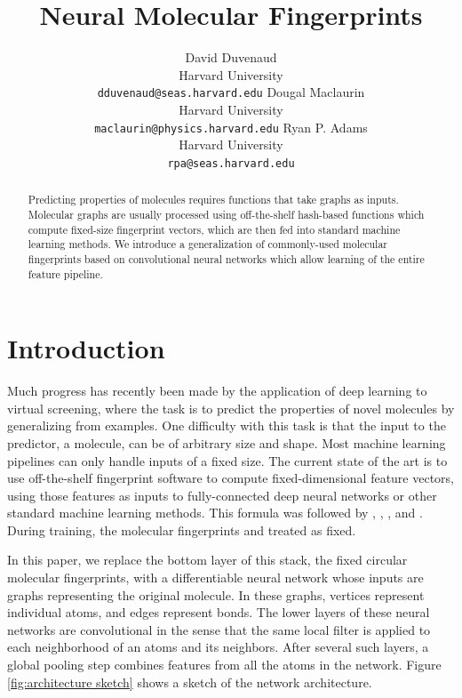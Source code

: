 \documentclass{article}
\title{Neural Molecular Fingerprints}%
\author{
David Duvenaud\\
Harvard University\\
\texttt{dduvenaud@seas.harvard.edu}
\And
Dougal Maclaurin\\
Harvard University\\
\texttt{maclaurin@physics.harvard.edu}
\And
Ryan P. Adams\\
Harvard University\\
\texttt{rpa@seas.harvard.edu}
}
\begin{document}
\maketitle

\begin{abstract}
Predicting properties of molecules requires functions that take graphs as inputs.
Molecular graphs are usually processed using off-the-shelf hash-based functions which compute fixed-size fingerprint vectors, which are then fed into standard machine learning methods.
We introduce a generalization of commonly-used molecular fingerprints based on convolutional neural networks which allow learning of the entire feature pipeline.
\end{abstract}

\section{Introduction}

Much progress has recently been made by the application of deep learning to virtual screening, where the task is to predict the properties of novel molecules by generalizing from examples.
One difficulty with this task is that the input to the predictor, a molecule, can be of arbitrary size and shape.
Most machine learning pipelines can only handle inputs of a fixed size.
The current state of the art is to use off-the-shelf fingerprint software to compute fixed-dimensional feature vectors, using those features as inputs to fully-connected deep neural networks or other standard machine learning methods.
This formula was followed by \citet{unterthinerdeep}, \citet{dahl2014multi}, \citet{tingley2014towards}, and \citet{ramsundar2015massively}.
During training, the molecular fingerprints and treated as fixed.

In this paper, we replace the bottom layer of this stack, the fixed circular molecular fingerprints, with a differentiable neural network whose inputs are graphs representing the original molecule.
In these graphs, vertices represent individual atoms, and edges represent bonds.
The lower layers of these neural networks are convolutional in the sense that the same local filter is applied to each neighborhood of an atoms and its neighbors.
After several such layers, a global pooling step combines features from all the atoms in the network.
Figure \ref{fig:architecture sketch} shows a sketch of the network architecture.
\end{document}
